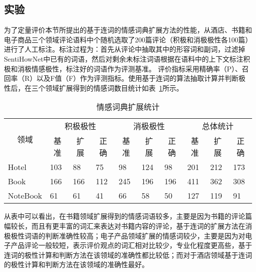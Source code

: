 \subsection{实验}
为了定量评价本节所提出的基于连词的情感词典扩展方法的性能，从酒店、书籍和电子商品三个领域评论语料中个随机选取了200篇评论（积极和消极极性各100篇）进行了人工标注。标注过程为：首先从评论中抽取其中的形容词和副词，过滤掉SentiHowNet中已有的词语，然后对剩余未标注词语根据在语料中的上下文标注积极和消极情感极性，标注好的词语作为评测基准。
评价指标采用精确率（P）、召回率（R）以及F值（F）作为评测指标。使用基于连词的算法抽取计算并判断极性后，在三个领域扩展得到的情感词数目统计如表~\ref{tab3-2}所示。
\begin{table}[htp]
\centering
\caption{情感词典扩展统计}
\label{tab3-2}
\begin{tabular}{|l|l|l|l|l|l|l|l|l|l|}
\hline
\multicolumn{1}{|c|}{\multirow{2}{*}{领域}} & \multicolumn{3}{c|}{积极极性} & \multicolumn{3}{c|}{消极极性} & \multicolumn{3}{c|}{总体统计} \\ \cline{2-10} 
\multicolumn{1}{|c|}{} & \multicolumn{1}{c|}{基准} & \multicolumn{1}{c|}{扩展} & \multicolumn{1}{c|}{正确} & \multicolumn{1}{c|}{基准} & \multicolumn{1}{c|}{扩展} & \multicolumn{1}{c|}{正确} & \multicolumn{1}{c|}{基准} & \multicolumn{1}{c|}{扩展} & \multicolumn{1}{c|}{正确} \\ \hline
Hotel & 103 & 88 & 75 & 98 & 124 & 98 & 201 & 212 & 173 \\ \hline
Book & 166 & 166 & 112 & 245 & 196 & 196 & 411 & 362 & 308 \\ \hline
NoteBook & 61 & 61 & 41 & 66 & 58 & 50 & 127 & 119 & 91 \\ \hline
\end{tabular}
\end{table}

从表中可以看出，在书籍领域扩展得到的情感词语较多，主要是因为书籍的评论篇幅较长，而且有更丰富的词汇来表达对书籍内容的评论，基于连词的扩展方法在消极极性词语的判断准确性较高；电子产品领域扩展的情感词较少，主要是因为对电子产品评论一般较短，表示评价观点的词汇相对比较少，专业化程度更高些，基于连词的极性计算和判断方法在该领域的准确性都比较低；而对于酒店领域基于连词的极性计算和判断方法在该领域的准确性最好。

